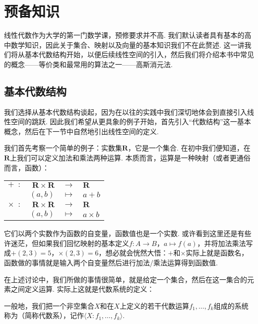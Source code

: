 \chapter{预备知识}

线性代数作为大学的第一门数学课，预修要求并不高. 我们默认读者具有基本的高中数学知识，因此关于集合、映射以及向量的基本知识我们不在此赘述. 这一讲我们将从基本代数结构开始，以便后续线性空间的引入，然后我们将介绍本书中常见的概念——等价类和最常用的算法之一——高斯消元法.

\section{基本代数结构}

我们选择从基本代数结构谈起，因为在以往的实践中我们深切地体会到直接引入线性空间的跳跃. 因此我们希望从更具象的例子开始，首先引入``代数结构''这一基本概念，然后在下一节中自然地引出线性空间的定义.

我们首先考察一个简单的例子：实数集$\mathbf{R}$，它是一个集合. 在初中我们便知道，在$\mathbf{R}$上我们可以定义加法和乘法两种运算. 本质而言，运算是一种映射（或者更通俗而言，函数）：

\begin{center}
    \begin{tabular}{rrcl}
        $+\enspace\colon$      & $\mathbf{R}\times\mathbf{R}$ & $\to$     & $\mathbf{R}$ \\
                               & $(a,b)$                      & $\mapsto$ & $a+b$        \\
        $\times\enspace\colon$ & $\mathbf{R}\times\mathbf{R}$ & $\to$     & $\mathbf{R}$ \\
                               & $(a,b)$                      & $\mapsto$ & $a\times b$
    \end{tabular}
\end{center}

它们以两个实数作为函数的自变量，函数值也是一个实数. 或许看到这里还是有些许迷茫，但如果我们回忆映射的基本定义$f:A\to B$，$a\mapsto f(a)$，并将加法乘法写成$+(2,3)=5$，$\times(2,3)=6$，想必就会恍然大悟：$+$和$\times$实际上就是函数名，函数做的事情就是输入两个自变量然后进行加法/乘法运算得到函数值.

在上述讨论中，我们所做的事情很简单，就是给定一个集合，然后在这一集合的元素之间定义运算. 实际上这就是代数系统的定义：
\begin{definition}
    一般地，我们把一个非空集合$X$和在$X$上定义的若干代数运算$f_1,\ldots,f_k$组成的系统称为（简称代数系），记作$\langle X : f_1,\ldots,f_k\rangle$.
\end{definition}

